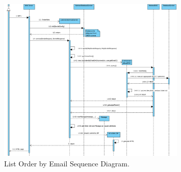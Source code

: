 \begin{figure}[h]
    \centering
    \includegraphics[width=0.8\textwidth]{mockup/ListOrderByEmailSequenceDiagram}
    \caption{List Order by Email Sequence Diagram.}
    \label{fig:listorder}
\end{figure}

\newpage
